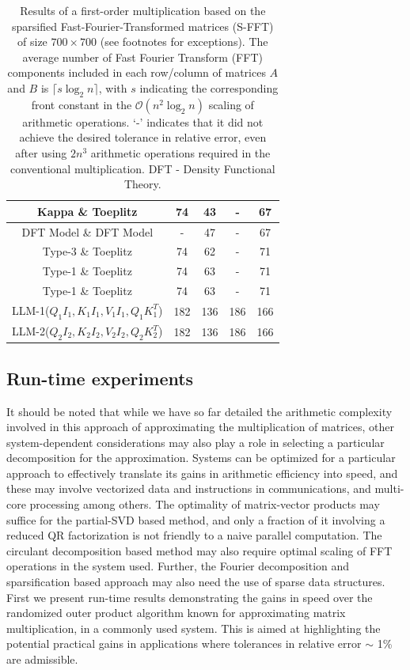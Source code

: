 \documentclass[onefignum,onetabnum]{siamart171218}
\begin{document}
\begin{table}[]
\begin{tabular}{|c|c|c|c|c|}
         \hline
          Kappa \& Toeplitz& 74 & 43& -& 67  \\
         \hline
          DFT Model \& DFT Model & - &47 & -& 67  \\
         \hline
          Type-3 \& Toeplitz&74  &62 &- &  71 \\
         \hline
         Type-1 \& Toeplitz& 74 &63 &- & 71 \\  
	\hline
	Type-1 \& Toeplitz & 74 & 63 & - & 71 \\
	\hline
        LLM-1($Q_1I_1,K_1I_1,V_1I_1,Q_1K_1^T$)\footnotemark[4]&182&136&186&166\\
         \hline
         LLM-2($Q_2I_2, K_2I_2, V_2I_2,Q_2K_2^T$)\footnotemark[4]&182&136&186&166\\
         \hline
    \end{tabular}
    \caption{Results of a first-order multiplication based on the sparsified Fast-Fourier-Transformed matrices (S-FFT) of size $700 \times 700$ (see footnotes for exceptions). The average number of Fast Fourier Transform (FFT) components included in each row/column of matrices $A$ and $B$ is $\lceil s \log_2 n \rceil$, with $s$ indicating the corresponding front constant in the $\mathcal{O}(n^2 \log_2 n)$ scaling of arithmetic operations. `-' indicates that it did not achieve the desired tolerance in relative error, even after using $2n^3$ arithmetic operations required in the conventional multiplication. DFT - Density Functional Theory.}
    \label{tab:FFT1}
\end{table}

\subsection{Run-time experiments}
It should be noted that while we have so far detailed the arithmetic complexity involved in this approach of approximating the multiplication of matrices, other system-dependent considerations may also play a role in selecting a particular decomposition for the approximation. 
Systems can be optimized for a particular approach to effectively translate its gains in arithmetic efficiency into speed, and these may involve vectorized data and instructions in communications, and multi-core processing among others. The optimality of matrix-vector products may suffice for the partial-SVD based method, and only a fraction of it involving a reduced QR factorization is not friendly to a naive parallel computation. The circulant decomposition based method may also require optimal scaling of FFT operations in the system used. Further, the Fourier decomposition and sparsification based approach may also need the use of sparse data structures. First we present run-time results demonstrating the gains in speed over the randomized outer product algorithm known for approximating matrix multiplication, in a commonly used system. This is aimed at highlighting the potential practical gains in applications where tolerances in relative error $\sim$ 1\% are admissible.
\end{document}
